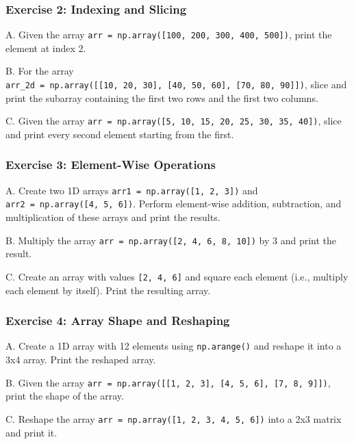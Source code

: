 \documentclass[
  letterpaper,
  DIV=11,
  numbers=noendperiod]{scrreprt}
\begin{document}
\hypertarget{exercise-2-indexing-and-slicing}{%
\subsubsection{Exercise 2: Indexing and
Slicing}\label{exercise-2-indexing-and-slicing}}

A. Given the array
\texttt{arr\ =\ np.array({[}100,\ 200,\ 300,\ 400,\ 500{]})}, print the
element at index 2.

B. For the array
\texttt{arr\_2d\ =\ np.array({[}{[}10,\ 20,\ 30{]},\ {[}40,\ 50,\ 60{]},\ {[}70,\ 80,\ 90{]}{]})},
slice and print the subarray containing the first two rows and the first
two columns.

C. Given the array
\texttt{arr\ =\ np.array({[}5,\ 10,\ 15,\ 20,\ 25,\ 30,\ 35,\ 40{]})},
slice and print every second element starting from the first.

\hypertarget{exercise-3-element-wise-operations}{%
\subsubsection{Exercise 3: Element-Wise
Operations}\label{exercise-3-element-wise-operations}}

A. Create two 1D arrays \texttt{arr1\ =\ np.array({[}1,\ 2,\ 3{]})} and
\texttt{arr2\ =\ np.array({[}4,\ 5,\ 6{]})}. Perform element-wise
addition, subtraction, and multiplication of these arrays and print the
results.

B. Multiply the array
\texttt{arr\ =\ np.array({[}2,\ 4,\ 6,\ 8,\ 10{]})} by 3 and print the
result.

C. Create an array with values \texttt{{[}2,\ 4,\ 6{]}} and square each
element (i.e., multiply each element by itself). Print the resulting
array.

\hypertarget{exercise-4-array-shape-and-reshaping}{%
\subsubsection{Exercise 4: Array Shape and
Reshaping}\label{exercise-4-array-shape-and-reshaping}}

A. Create a 1D array with 12 elements using \texttt{np.arange()} and
reshape it into a 3x4 array. Print the reshaped array.

B. Given the array
\texttt{arr\ =\ np.array({[}{[}1,\ 2,\ 3{]},\ {[}4,\ 5,\ 6{]},\ {[}7,\ 8,\ 9{]}{]})},
print the shape of the array.

C. Reshape the array
\texttt{arr\ =\ np.array({[}1,\ 2,\ 3,\ 4,\ 5,\ 6{]})} into a 2x3 matrix
and print it.
\end{document}
